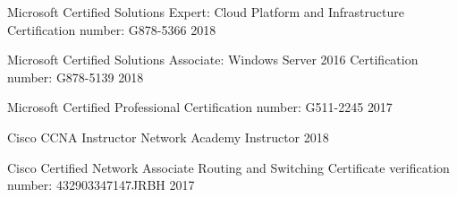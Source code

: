 



\begin{cvcertifications}

	\cvcertification
		{Microsoft Certified Solutions Expert: Cloud Platform and Infrastructure} %
		{Certification number: G878-5366} %
		{2018} %
		
	\cvcertification
		{Microsoft Certified Solutions Associate: Windows Server 2016} %
		{Certification number: G878-5139} %
		{2018} %

	\cvcertification
		{Microsoft Certified Professional} %
		{Certification number: G511-2245} %
		{2017} %
\end{cvcertifications}




\begin{cvcertifications}

	\cvcertification
		{Cisco CCNA Instructor} %
		{Network Academy Instructor} %
		{2018} %
		
	\cvcertification
		{Cisco Certified Network Associate Routing and Switching} %
		{Certificate verification number: 432903347147JRBH} %
		{2017} %
\end{cvcertifications}

